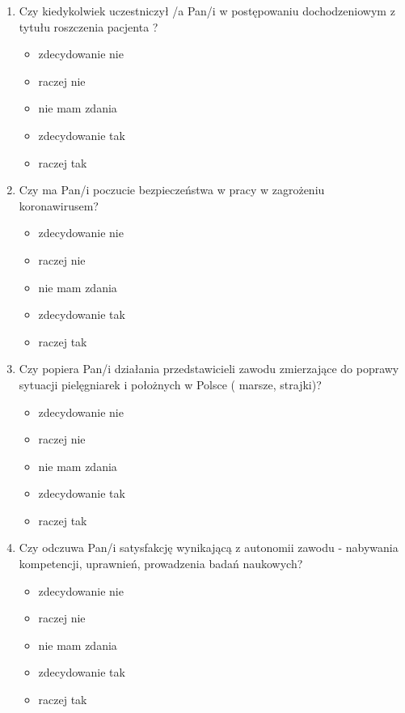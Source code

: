 \documentclass[a4paper,12pt,twoside,openright]{mwrep}
\begin{document}
\begin{appendices}
\begin{enumerate}[label=\arabic*)]
			\item{Czy kiedykolwiek uczestniczył /a Pan/i w postępowaniu dochodzeniowym z tytułu roszczenia pacjenta ?}
		\begin{itemize}
			\item{zdecydowanie nie}
			\item{raczej nie}
			\item{nie mam zdania}
			\item{zdecydowanie tak}
			\item{raczej tak}
		\end{itemize}
		\vspace{\baselineskip}
		
			\item{Czy ma Pan/i poczucie bezpieczeństwa w pracy w zagrożeniu koronawirusem?}
		\begin{itemize}
			\item{zdecydowanie nie}
			\item{raczej nie}
			\item{nie mam zdania}
			\item{zdecydowanie tak}
			\item{raczej tak}
		\end{itemize}
		\vspace{\baselineskip}
		
			\item{ Czy popiera Pan/i działania przedstawicieli zawodu zmierzające do poprawy sytuacji pielęgniarek i położnych w Polsce ( marsze, strajki)?}
		\begin{itemize}
			\item{zdecydowanie nie}
			\item{raczej nie}
			\item{nie mam zdania}
			\item{zdecydowanie tak}
			\item{raczej tak}
		\end{itemize}
		\vspace{\baselineskip}
		
			\item{Czy odczuwa Pan/i satysfakcję wynikającą z autonomii zawodu  - nabywania kompetencji, uprawnień, prowadzenia badań naukowych?}
		\begin{itemize}
			\item{zdecydowanie nie}
			\item{raczej nie}
			\item{nie mam zdania}
			\item{zdecydowanie tak}
			\item{raczej tak}
		\end{itemize}
		\vspace{\baselineskip}
		

\end{enumerate}
\end{appendices}
\end{document}
